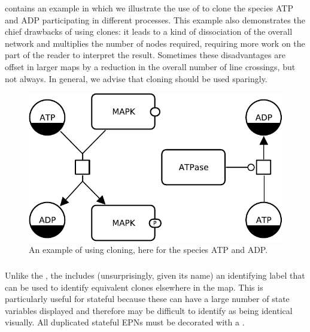  contains an example in which we illustrate the use of  to clone the species ATP and ADP participating in different processes.  This example also demonstrates the chief drawbacks of using clones: it leads to a kind of dissociation of the overall network and multiplies the number of nodes required, requiring more work on the part of the reader to interpret the result.  Sometimes these disadvantages are offset in larger maps by a reduction in the overall number of line crossings, but not always.  In general, we advise that cloning should be used sparingly.

\begin{figure}[H]
  \centering
  \includegraphics[scale = 0.8]{examples/cloning}
  \caption{An example of using cloning, here for the species ATP and ADP.}
  \label{fig:example-cloning}
\end{figure}

\subsubsection{}

Unlike the , the  includes (unsurprisingly, given its name) an identifying label that can be used to identify equivalent clones elsewhere in the map.
This is particularly useful for stateful  because these can have a large number of state variables displayed and therefore may be difficult to identify as being identical visually.
All duplicated stateful EPNs must be decorated with a .

